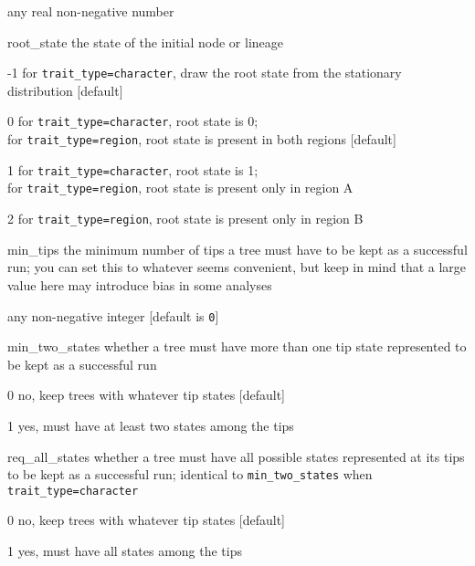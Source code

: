 \documentclass[10pt]{article}
\begin{document}
\begin{optdescrip}
		\begin{valdescrip}
			\item[] any real non-negative number
		\end{valdescrip}
	\item[root\_state] the state of the initial node or lineage
		\begin{valdescrip}
			\item[-1] for \texttt{trait\_type=character}, draw the root state from the stationary distribution [default]
			\item[0] for \texttt{trait\_type=character}, root state is 0; \\
				for \texttt{trait\_type=region}, root state is present in both regions [default]
			\item[1] for \texttt{trait\_type=character}, root state is 1; \\
				for \texttt{trait\_type=region}, root state is present only in region A
			\item[2] for \texttt{trait\_type=region}, root state is present only in region B
		\end{valdescrip}
	\item[min\_tips] the minimum number of tips a tree must have to be kept as a successful run; you can set this to whatever seems convenient, but keep in mind that a large value here may introduce bias in some analyses
		\begin{valdescrip}
			\item[] any non-negative integer [default is \texttt{0}]
		\end{valdescrip}
	\item[min\_two\_states] whether a tree must have more than one tip state represented to be kept as a successful run
		\begin{valdescrip}
			\item[0] no, keep trees with whatever tip states [default]
			\item[1] yes, must have at least two states among the tips
		\end{valdescrip}
	\item[req\_all\_states] whether a tree must have all possible states represented at its tips to be kept as a successful run; identical to \texttt{min\_two\_states} when \texttt{trait\_type=character}
		\begin{valdescrip}
			\item[0] no, keep trees with whatever tip states [default]
			\item[1] yes, must have all states among the tips

\end{valdescrip}
\end{optdescrip}
\end{document}

